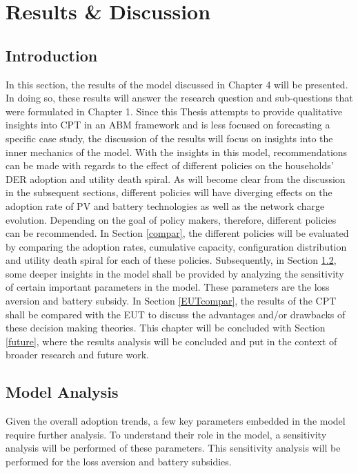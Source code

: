 \chapter{Results \& Discussion}
\section{Introduction}
In this section, the results of the model discussed in Chapter 4 will be presented. In doing so, these results will answer the research question and sub-questions that were formulated in Chapter 1. Since this Thesis attempts to provide qualitative insights into CPT in an ABM framework and is less focused on forecasting a specific case study, the discussion of the results will focus on insights into the inner mechanics of the model. With the insights in this model, recommendations can be made with regards to the effect of different policies on the households' DER adoption and utility death spiral. As will become clear from the discussion in the subsequent sections, different policies will have diverging effects on the adoption rate of PV and battery technologies as well as the network charge evolution. Depending on the goal of policy makers, therefore, different policies can be recommended. In Section \ref{compar}, the different policies will be evaluated by comparing the adoption rates, cumulative capacity, configuration distribution and utility death spiral for each of these policies. Subsequently, in Section \ref{analysis}, some deeper insights in the model shall be provided by analyzing the sensitivity of certain important parameters in the model. These parameters are the loss aversion and battery subsidy. In Section \ref{EUTcompar}, the results of the CPT shall be compared with the EUT to discuss the advantages and/or drawbacks of these decision making theories. This chapter will be concluded with Section \ref{future}, where the results analysis will be concluded and put in the context of broader research and future work.
\newline \newline \noindent

\section{Model Analysis} \label{analysis}
Given the overall adoption trends, a few key parameters embedded in the model require further analysis. To understand their role in the model, a sensitivity analysis will be performed of these parameters. This sensitivity analysis will be performed for the loss aversion and battery subsidies.
